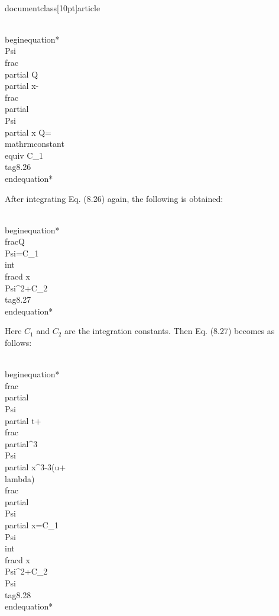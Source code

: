\\documentclass[10pt]{article}
\begin{document}
{{{{{\\begin{equation*}
\\Psi \\frac{\\partial Q}{\\partial x}-\\frac{\\partial \\Psi}{\\partial x} Q=\\mathrm{constant} \\equiv C_{1} \\tag{8.26}
\\end{equation*}


After integrating Eq. (8.26) again, the following is obtained:


\\begin{equation*}
\\frac{Q}{\\Psi}=C_{1} \\int \\frac{d x}{\\Psi^{2}}+C_{2} \\tag{8.27}
\\end{equation*}


Here $C_{1}$ and $C_{2}$ are the integration constants. Then Eq. (8.27) becomes as follows:


\\begin{equation*}
\\frac{\\partial \\Psi}{\\partial t}+\\frac{\\partial^{3} \\Psi}{\\partial x^{3}}-3(u+\\lambda) \\frac{\\partial \\Psi}{\\partial x}=C_{1} \\Psi \\int \\frac{d x}{\\Psi^{2}}+C_{2} \\Psi \\tag{8.28}
\\end{equation*}


}}}}}
\end{document}
